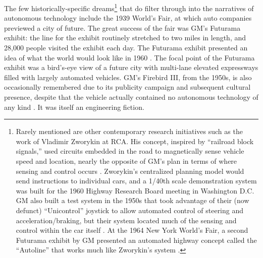 The few historically-specific 
dreams\footnote{Rarely mentioned are other contemporary research
  initiatives such as the work of Vladimir Zworykin at RCA. His
  concept, inspired by ``railroad block signals,'' used circuits
  embedded in the road to magnetically sense vehicle speed and
  location, nearly the opposite of GM's plan in terms of where sensing
and control occurs \cite[p. 9]{wetmore}. Zworykin's centralized planning model would send
instructions to individual cars, and a 1/40th scale demonstration
system was built for the 1960 Highway Research Board meeting in
Washington D.C. GM also built a test system in the 1950s that took
advantage of their (now defunct) ``Unicontrol'' joystick to allow
automated control of steering and acceleration/braking, but their
system located much of the sensing and control within the car
itself \cite[p. 8]{wetmore}. At the 1964 New York World's Fair, a
second Futurama exhibit by GM presented an automated highway concept
called the ``Autoline'' that works much like Zworykin's
system \cite[p. 9]{wetmore}.} that do filter through into the narratives of autonomous
technology \cite{CBSPetersen} include the 1939 World's Fair, at which auto companies
previewed a city of future. The great success of the fair was GM's
Futurama exhibit: the line for the exhibit routinely stretched to two
miles in length, and 28,000 people visited the exhibit each day. The
Futurama exhibit presented an idea of what the world would look like
in 1960 \cite[p. 371]{nyeElectrifying}. The focal point of the Futurama
exhibit was a bird's-eye view of a future city with multi-lane elevated
expressways filled with largely automated vehicles. GM's Firebird III,
from the 1950s, is also occasionally remembered due to its publicity campaign and
subsequent cultural presence, \cite{walshVs} despite that the vehicle actually
contained no autonomous technology of any kind \cite[p. 7]{wetmore}. It was
itself an engineering fiction. 

